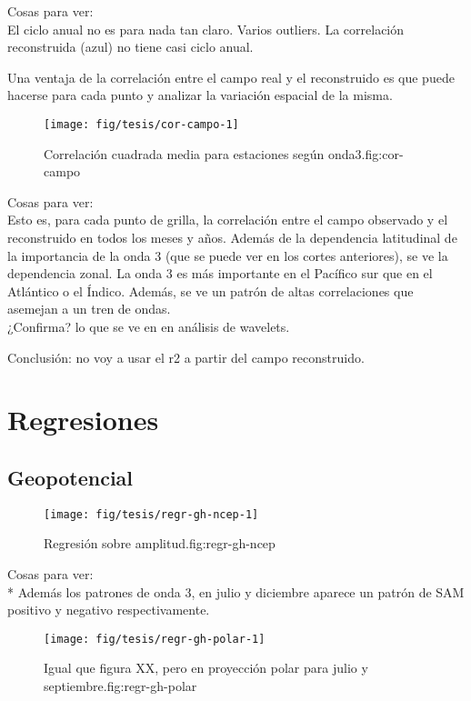\documentclass[spanish,a4paper]{book}
\begin{document}
Cosas para ver:\\
El ciclo anual no es para nada tan claro. Varios outliers. La
correlación reconstruida (azul) no tiene casi ciclo anual.

Una ventaja de la correlación entre el campo real y el reconstruido es
que puede hacerse para cada punto y analizar la variación espacial de la
misma.

\begin{figure}
\texttt{[image: fig/tesis/cor-campo-1]} \caption{Correlación cuadrada media para estaciones según onda3.{fig:cor-campo}}\label{fig:cor-campo}
\end{figure}

Cosas para ver:\\
Esto es, para cada punto de grilla, la correlación entre el campo
observado y el reconstruido en todos los meses y años. Además de la
dependencia latitudinal de la importancia de la onda 3 (que se puede ver
en los cortes anteriores), se ve la dependencia zonal. La onda 3 es más
importante en el Pacífico sur que en el Atlántico o el Índico. Además,
se ve un patrón de altas correlaciones que asemejan a un tren de
ondas.\\
¿Confirma? lo que se ve en en análisis de wavelets.

Conclusión: no voy a usar el r2 a partir del campo reconstruido.

\section{Regresiones}\label{regresiones}

\subsection{Geopotencial}\label{geopotencial}

\begin{figure}

{\centering \texttt{[image: fig/tesis/regr-gh-ncep-1]} 

}

\caption{Regresión sobre amplitud.{fig:regr-gh-ncep}}\label{fig:regr-gh-ncep}
\end{figure}

Cosas para ver:\\
* Además los patrones de onda 3, en julio y diciembre aparece un patrón
de SAM positivo y negativo respectivamente.

\begin{figure}
\texttt{[image: fig/tesis/regr-gh-polar-1]} \caption{Igual que figura  XX, pero en proyección polar para julio y septiembre.{fig:regr-gh-polar}}\label{fig:regr-gh-polar}
\end{figure}
\end{document}
